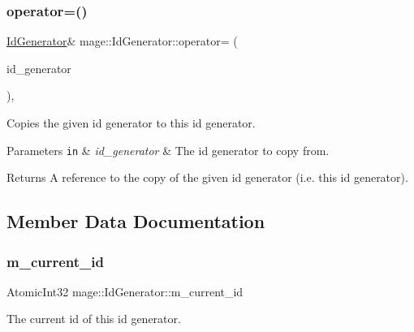 \subsubsection{\texorpdfstring{operator=()}{operator=()}}
{\footnotesize\ttfamily \hyperlink{structmage_1_1_id_generator}{Id\+Generator}\& mage\+::\+Id\+Generator\+::operator= (\begin{DoxyParamCaption}\item[{const \hyperlink{structmage_1_1_id_generator}{Id\+Generator} \&}]{id\+\_\+generator }\end{DoxyParamCaption})\hspace{0.3cm}{\ttfamily [private]}, {\ttfamily [delete]}}

Copies the given id generator to this id generator.


\begin{DoxyParams}[1]{Parameters}
\mbox{\tt in}  & {\em id\+\_\+generator} & The id generator to copy from. \\
\hline
\end{DoxyParams}
\begin{DoxyReturn}{Returns}
A reference to the copy of the given id generator (i.\+e. this id generator). 
\end{DoxyReturn}


\subsection{Member Data Documentation}
\hypertarget{structmage_1_1_id_generator_ab094c8e57444d4fa02d5f3c2a5ea25f3}{}\label{structmage_1_1_id_generator_ab094c8e57444d4fa02d5f3c2a5ea25f3} 
\subsubsection{\texorpdfstring{m\+\_\+current\+\_\+id}{m\_current\_id}}
{\footnotesize\ttfamily Atomic\+Int32 mage\+::\+Id\+Generator\+::m\+\_\+current\+\_\+id\hspace{0.3cm}{\ttfamily [private]}}

The current id of this id generator. 